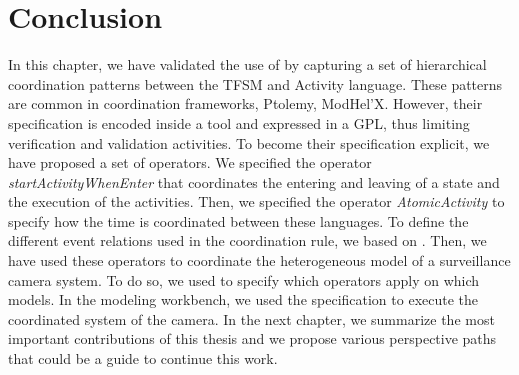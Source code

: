 \section{Conclusion}
In this chapter, we have validated the use of \bcool by capturing a set of hierarchical coordination patterns between the TFSM and Activity language. These patterns are common in coordination frameworks, \eg Ptolemy, ModHel'X. However, their specification is encoded inside a tool and expressed in a GPL, thus limiting verification and validation activities. To become their specification explicit, we have proposed a set of \bcool operators. We specified the operator \emph{startActivityWhenEnter} that coordinates the entering and leaving of a state and the execution of the activities. Then, we specified the operator \emph{AtomicActivity} to specify how the time is coordinated between these languages. To define the different event relations used in the coordination rule, we based on \moccml. Then, we have used these operators to coordinate the heterogeneous model of a surveillance camera system. To do so, we used \bflow to specify which operators apply on which models. In the modeling workbench, we used the \bflow specification to execute the coordinated system of the camera. In the next chapter, we summarize the most important contributions of this thesis and we propose various perspective paths that could be a guide to continue this work. 

 
